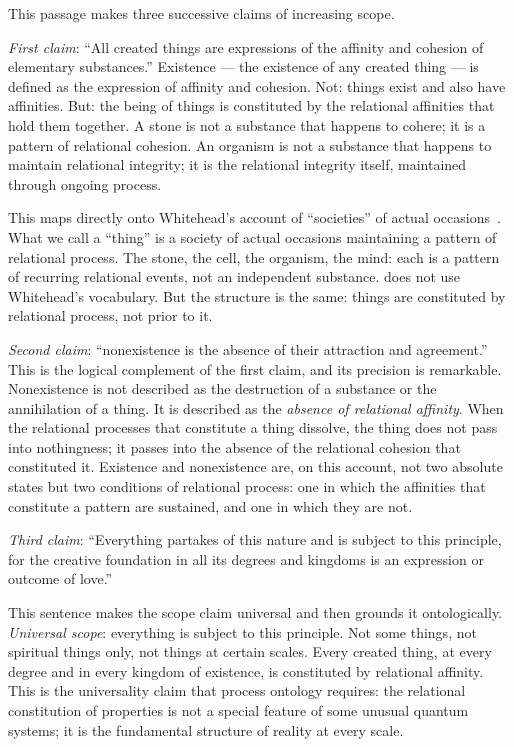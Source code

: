 This passage makes three successive claims of increasing scope.

\emph{First claim}: ``All created things are expressions of the affinity and
cohesion of elementary substances.''
Existence --- the existence of any created thing --- is defined as the expression
of affinity and cohesion.
Not: things exist and also have affinities.
But: the being of things is constituted by the relational affinities that hold
them together.
A stone is not a substance that happens to cohere; it is a pattern of relational
cohesion.
An organism is not a substance that happens to maintain relational integrity; it
is the relational integrity itself, maintained through ongoing process.

This maps directly onto Whitehead's account of ``societies'' of actual
occasions~\citep{Whitehead1929}.
What we call a ``thing'' is a society of actual occasions maintaining a pattern
of relational process.
The stone, the cell, the organism, the mind: each is a pattern of recurring
relational events, not an independent substance.
\AbdulBaha does not use Whitehead's vocabulary.
But the structure is the same: things are constituted by relational process,
not prior to it.

\emph{Second claim}: ``nonexistence is the absence of their attraction and agreement.''
This is the logical complement of the first claim, and its precision is remarkable.
Nonexistence is not described as the destruction of a substance or the
annihilation of a thing.
It is described as the \emph{absence of relational affinity}.
When the relational processes that constitute a thing dissolve, the thing does
not pass into nothingness; it passes into the absence of the relational cohesion
that constituted it.
Existence and nonexistence are, on this account, not two absolute states but two
conditions of relational process: one in which the affinities that constitute a
pattern are sustained, and one in which they are not.

\emph{Third claim}: ``Everything partakes of this nature and is subject to this
principle, for the creative foundation in all its degrees and kingdoms is an
expression or outcome of love.''

This sentence makes the scope claim universal and then grounds it ontologically.
\emph{Universal scope}: everything is subject to this principle.
Not some things, not spiritual things only, not things at certain scales.
Every created thing, at every degree and in every kingdom of existence, is
constituted by relational affinity.
This is the universality claim that process ontology requires: the relational
constitution of properties is not a special feature of some unusual quantum
systems; it is the fundamental structure of reality at every scale.

